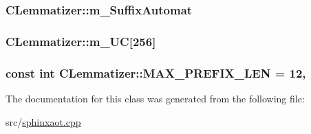 \hypertarget{classCLemmatizer_aa1098b2b33498d4c9f332aa8cb08b26e}{
\subsubsection[{m\-\_\-\-Suffix\-Automat}]{ C\-Lemmatizer\-::m\-\_\-\-Suffix\-Automat\hspace{0.3cm}{\ttfamily [protected]}}}\label{classCLemmatizer_aa1098b2b33498d4c9f332aa8cb08b26e}
\hypertarget{classCLemmatizer_a5b90b2010d69693a7e096235db1c28cd}{
\subsubsection[{m\-\_\-\-U\-C}]{ C\-Lemmatizer\-::m\-\_\-\-U\-C\mbox{[}256\mbox{]}\hspace{0.3cm}{\ttfamily [protected]}}}\label{classCLemmatizer_a5b90b2010d69693a7e096235db1c28cd}
\hypertarget{classCLemmatizer_a741c02dd57aa5794e6f197f9d533fac4}{
\subsubsection[{M\-A\-X\-\_\-\-P\-R\-E\-F\-I\-X\-\_\-\-L\-E\-N}]{\setlength{\rightskip}{0pt plus 5cm}const {\bf int} C\-Lemmatizer\-::\-M\-A\-X\-\_\-\-P\-R\-E\-F\-I\-X\-\_\-\-L\-E\-N = 12\hspace{0.3cm}{\ttfamily [static]}, {\ttfamily [protected]}}}\label{classCLemmatizer_a741c02dd57aa5794e6f197f9d533fac4}


The documentation for this class was generated from the following file\-:\begin{DoxyCompactItemize}
\item 
src/\hyperlink{sphinxaot_8cpp}{sphinxaot.\-cpp}\end{DoxyCompactItemize}
